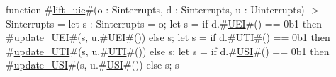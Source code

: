 function #\hyperref[sailRISCVzliftzyuie]{lift\_uie}#(o : Sinterrupts, d : Sinterrupts, u : Uinterrupts) -> Sinterrupts = {
  let s : Sinterrupts = o;
  let s = if d.#\hyperref[sailRISCVzUEI]{UEI}#() == 0b1 then #\hyperref[sailRISCVzupdatezyUEI]{update\_UEI}#(s, u.#\hyperref[sailRISCVzUEI]{UEI}#()) else s;
  let s = if d.#\hyperref[sailRISCVzUTI]{UTI}#() == 0b1 then #\hyperref[sailRISCVzupdatezyUTI]{update\_UTI}#(s, u.#\hyperref[sailRISCVzUTI]{UTI}#()) else s;
  let s = if d.#\hyperref[sailRISCVzUSI]{USI}#() == 0b1 then #\hyperref[sailRISCVzupdatezyUSI]{update\_USI}#(s, u.#\hyperref[sailRISCVzUSI]{USI}#()) else s;
  s
}

